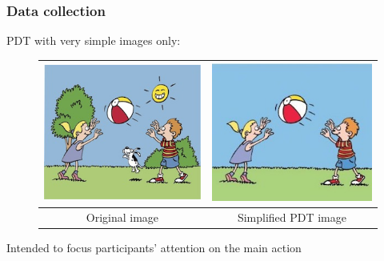 \documentclass[xcolor={dvipsnames}]{beamer}
\begin{document}
\begin{frame}
\frametitle{Data collection}
\medskip

PDT with very simple images only:

\begin{figure}[htb!]
\begin{center}
\begin{tabular}{|c|c|}
\hline
{\includegraphics[width=0.38\columnwidth]{figures/throw-original.jpg}} & {\includegraphics[width=0.38\columnwidth]{figures/I21cropped.jpg}} \\
\hline
Original image & Simplified PDT image \\
\hline
\end{tabular}
\end{center}
\end{figure}

Intended to focus participants' attention on the main action
\end{frame}
\end{document}

